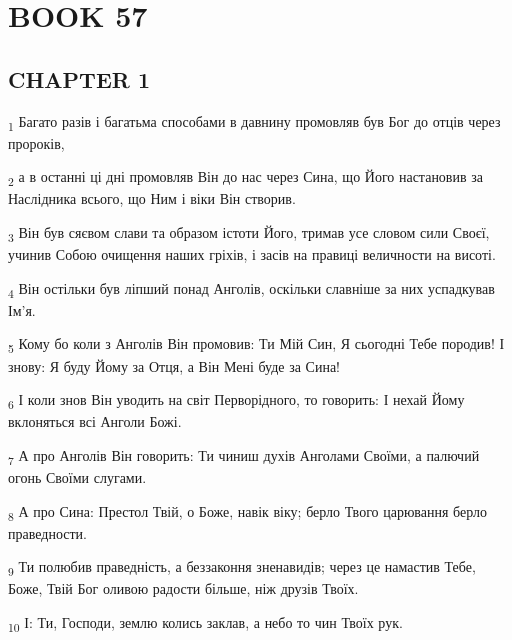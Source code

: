 \section{BOOK 57}
\subsection{CHAPTER 1}
\begin{tcolorbox}
\textsubscript{1} Багато разів і багатьма способами в давнину промовляв був Бог до отців через пророків,
\end{tcolorbox}
\begin{tcolorbox}
\textsubscript{2} а в останні ці дні промовляв Він до нас через Сина, що Його настановив за Наслідника всього, що Ним і віки Він створив.
\end{tcolorbox}
\begin{tcolorbox}
\textsubscript{3} Він був сяєвом слави та образом істоти Його, тримав усе словом сили Своєї, учинив Собою очищення наших гріхів, і засів на правиці величности на висоті.
\end{tcolorbox}
\begin{tcolorbox}
\textsubscript{4} Він остільки був ліпший понад Анголів, оскільки славніше за них успадкував Ім'я.
\end{tcolorbox}
\begin{tcolorbox}
\textsubscript{5} Кому бо коли з Анголів Він промовив: Ти Мій Син, Я сьогодні Тебе породив! І знову: Я буду Йому за Отця, а Він Мені буде за Сина!
\end{tcolorbox}
\begin{tcolorbox}
\textsubscript{6} І коли знов Він уводить на світ Перворідного, то говорить: І нехай Йому вклоняться всі Анголи Божі.
\end{tcolorbox}
\begin{tcolorbox}
\textsubscript{7} А про Анголів Він говорить: Ти чиниш духів Анголами Своїми, а палючий огонь Своїми слугами.
\end{tcolorbox}
\begin{tcolorbox}
\textsubscript{8} А про Сина: Престол Твій, о Боже, навік віку; берло Твого царювання берло праведности.
\end{tcolorbox}
\begin{tcolorbox}
\textsubscript{9} Ти полюбив праведність, а беззаконня зненавидів; через це намастив Тебе, Боже, Твій Бог оливою радости більше, ніж друзів Твоїх.
\end{tcolorbox}
\begin{tcolorbox}
\textsubscript{10} І: Ти, Господи, землю колись заклав, а небо то чин Твоїх рук.
\end{tcolorbox}
